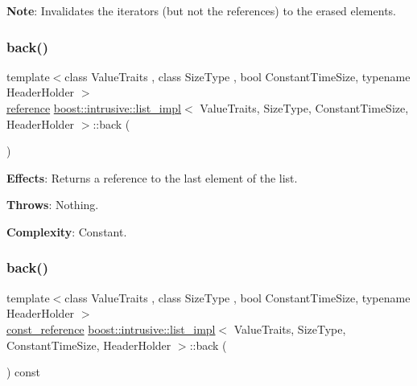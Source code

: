 {\bfseries Note}\+: Invalidates the iterators (but not the references) to the erased elements. \mbox{\label{classboost_1_1intrusive_1_1list__impl_a257758f8527be08329dbc14ca5527fd8}} 
\subsubsection{\texorpdfstring{back()}{back()}\hspace{0.1cm}{\footnotesize\ttfamily [1/2]}}
{\footnotesize\ttfamily template$<$class Value\+Traits , class Size\+Type , bool Constant\+Time\+Size, typename Header\+Holder $>$ \\
\hyperlink{classboost_1_1intrusive_1_1list__impl_a881763b587dbe7c0237a552a9e89755a}{reference} \hyperlink{classboost_1_1intrusive_1_1list__impl}{boost\+::intrusive\+::list\+\_\+impl}$<$ Value\+Traits, Size\+Type, Constant\+Time\+Size, Header\+Holder $>$\+::back (\begin{DoxyParamCaption}{ }\end{DoxyParamCaption})\hspace{0.3cm}{\ttfamily [inline]}}

{\bfseries Effects}\+: Returns a reference to the last element of the list.

{\bfseries Throws}\+: Nothing.

{\bfseries Complexity}\+: Constant. \mbox{\label{classboost_1_1intrusive_1_1list__impl_a92fa54fafbdf353a6b51c145c775d215}} 
\subsubsection{\texorpdfstring{back()}{back()}\hspace{0.1cm}{\footnotesize\ttfamily [2/2]}}
{\footnotesize\ttfamily template$<$class Value\+Traits , class Size\+Type , bool Constant\+Time\+Size, typename Header\+Holder $>$ \\
\hyperlink{classboost_1_1intrusive_1_1list__impl_a3d37629151c76fb8389ac3ba3b359201}{const\+\_\+reference} \hyperlink{classboost_1_1intrusive_1_1list__impl}{boost\+::intrusive\+::list\+\_\+impl}$<$ Value\+Traits, Size\+Type, Constant\+Time\+Size, Header\+Holder $>$\+::back (\begin{DoxyParamCaption}{ }\end{DoxyParamCaption}) const\hspace{0.3cm}{\ttfamily [inline]}}

